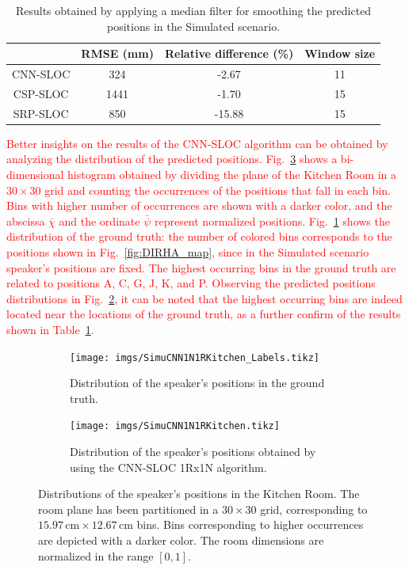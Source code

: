 \documentclass[review]{elsarticle}
\newcommand{\figref}[1]{Fig.~\ref{#1}}
\newcommand{\tableref}[1]{Table~\ref{#1}}
\begin{document}
\begin{table}[t]
\centering
\caption{Results obtained by applying a median filter for smoothing the predicted positions in the Simulated scenario.}\label{tab:smooth_sim}
\begin{tabular}{c | c | c | c}
  	 				& RMSE (mm) & Relative difference (\%) & Window size \\
\hline
CNN-SLOC    & 324 & -2.67  & 11\\
CSP-SLOC    & 1441 & -1.70 & 15\\
SRP-SLOC    & 850 & -15.88 & 15\\
\end{tabular}
\end{table}

\textcolor{red}{
Better insights on the results of the CNN-SLOC algorithm can be obtained by analyzing the distribution of the predicted positions. \figref{fig:distr_simu} shows a bi-dimensional histogram obtained by dividing the plane of the Kitchen Room in a $30 \times 30$ grid and counting the occurrences of the positions that fall in each bin. Bins with higher number of occurrences are shown with a darker color, and the abscissa $\bar{\chi}$ and the ordinate $\bar{\psi}$ represent normalized positions. \figref{fig:distr_simu_gt} shows the distribution of the ground truth: the number of colored bins corresponds to the positions shown in \figref{fig:DIRHA_map}, since in the Simulated scenario speaker's positions are fixed. The highest occurring bins in the ground truth are related to positions A, C, G, J, K, and P. Observing the predicted positions distributions in \figref{fig:distr_simu_pred}, it can be noted that the highest occurring bins are indeed located near the locations of the ground truth, as a further confirm of the results shown in \tableref{tab:smooth_sim}.}

\begin{figure}[t]
\centering
\begin{subfigure}[t]{0.45\textwidth}
\texttt{[image: imgs/SimuCNN1N1RKitchen\_Labels.tikz]}
\caption{Distribution of the speaker's positions in the ground truth.}\label{fig:distr_simu_gt}
\end{subfigure}
\begin{subfigure}[t]{0.45\textwidth}
\texttt{[image: imgs/SimuCNN1N1RKitchen.tikz]}
\caption{Distribution of the speaker's positions obtained by using the CNN-SLOC 1Rx1N algorithm.}\label{fig:distr_simu_pred}
\end{subfigure}
\caption{Distributions of the speaker's positions in the Kitchen Room. The room plane has been partitioned in a $30\times 30$ grid, corresponding to $15.97\,\text{cm} \times 12.67\,\text{cm}$ bins. Bins corresponding to higher occurrences are depicted with a darker color. The room dimensions are normalized in the range $[0,1]$.}\label{fig:distr_simu}
\end{figure}
\end{document}
